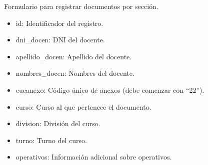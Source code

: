 \documentclass[letterpaper,10pt,spanish]{sphinxmanual}
\begin{document}
\begin{fulllineitems}

\pysigstartsignatures
{}
\pysigstopsignatures
\sphinxAtStartPar
Formulario para registrar documentos por sección.
\begin{description}
\begin{itemize}
\item {} 
\sphinxAtStartPar
id: Identificador del registro.

\item {} 
\sphinxAtStartPar
dni\_docen: DNI del docente.

\item {} 
\sphinxAtStartPar
apellido\_docen: Apellido del docente.

\item {} 
\sphinxAtStartPar
nombres\_docen: Nombres del docente.

\item {} 
\sphinxAtStartPar
cueanexo: Código único de anexos (debe comenzar con “22”).

\item {} 
\sphinxAtStartPar
curso: Curso al que pertenece el documento.

\item {} 
\sphinxAtStartPar
division: División del curso.

\item {} 
\sphinxAtStartPar
turno: Turno del curso.

\item {} 
\sphinxAtStartPar
operativos: Información adicional sobre operativos.


\end{itemize}
\end{description}
\end{fulllineitems}
\end{document}
